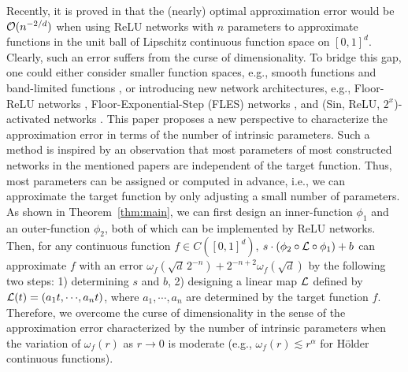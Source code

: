 \documentclass[nohyperref]{article}
\theoremstyle{plain}
\theoremstyle{definition}
\theoremstyle{remark}
\begin{document}
Recently, it is proved in \cite{shijun2,yarotsky18a,shijun:thesis} that the (nearly) optimal approximation error would be ${\mathcal{O}}(n^{-2/d})$ when using ReLU networks with $n$ parameters to approximate functions in the unit ball of Lipschitz continuous function space on $[0,1]^d$. Clearly, such an error suffers from the curse of dimensionality. To bridge this gap, one could either consider smaller function spaces, e.g., smooth functions \cite{shijun3,yarotsky:2019:06} and band-limited functions \cite{bandlimit}, or introducing new network architectures, e.g.,  Floor-ReLU networks \cite{shijun4}, Floor-Exponential-Step (FLES) networks \cite{shijun5}, and  (Sin, ReLU, $2^x$)-activated networks \cite{jiao2021deep}. This paper proposes a new perspective to characterize the approximation error in terms of the number of intrinsic parameters. 
Such a method is inspired by an observation that most parameters of most constructed networks in the mentioned papers are independent of the target function. Thus, most parameters can be assigned or computed in advance, i.e., we can approximate the target function by only adjusting a small number of parameters.
As shown in Theorem~\ref{thm:main}, we can first design an inner-function  $\phi_1$ and an outer-function $\phi_2$, both of which can be implemented by ReLU networks. Then, for any continuous function $f\in C([0,1]^d)$, $s\cdot(\phi_2\circ{\mathcal{L}}\circ\phi_1)+b$ can approximate $f$ with an error $\omega_f(\sqrt{d}\, 2^{-n})+2^{-n+2}\omega_f(\sqrt{d})$ by the following two steps: 1) determining $s$ and $b$, 2) designing a linear map ${\mathcal{L}}$ defined by $\calL(t)=(a_1t,\cdots,a_n t)$, where $a_1,\cdots,a_n$ are determined by the target function $f$. Therefore, we overcome the curse of  dimensionality in the sense of the approximation error characterized by the number of intrinsic parameters when the variation of $\omega_f(r)$ as $r\to 0$ is moderate (e.g., $\omega_f(r) \lesssim r^\alpha$ for H\"older continuous functions).






\end{document}
